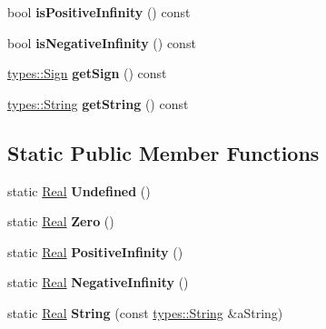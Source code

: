 \begin{DoxyCompactItemize}
bool {\bfseries is\+Positive\+Infinity} () const
\item 
\mbox{\label{classlibrary_1_1core_1_1types_1_1_real_a5d7286e45a9f05cda79402c9d8efbc13}} 
bool {\bfseries is\+Negative\+Infinity} () const
\item 
\mbox{\label{classlibrary_1_1core_1_1types_1_1_real_a0e92ad5d5a946dcc64385e1bf47003c8}} 
\hyperlink{_sign_8hpp_a06d9eaa410d43a0fa3f383040618e87d}{types\+::\+Sign} {\bfseries get\+Sign} () const
\item 
\mbox{\label{classlibrary_1_1core_1_1types_1_1_real_ac075065c78713b32a2144756efaae7b0}} 
\hyperlink{classlibrary_1_1core_1_1types_1_1_string}{types\+::\+String} {\bfseries get\+String} () const
\end{DoxyCompactItemize}
\subsection*{Static Public Member Functions}
\begin{DoxyCompactItemize}
\item 
\mbox{\label{classlibrary_1_1core_1_1types_1_1_real_a67778e3d4c5a5b6ca6ddcd47964b9a79}} 
static \hyperlink{classlibrary_1_1core_1_1types_1_1_real}{Real} {\bfseries Undefined} ()
\item 
\mbox{\label{classlibrary_1_1core_1_1types_1_1_real_a35434e6329366cb571efbd9c4ead6501}} 
static \hyperlink{classlibrary_1_1core_1_1types_1_1_real}{Real} {\bfseries Zero} ()
\item 
\mbox{\label{classlibrary_1_1core_1_1types_1_1_real_a7f4aa42fec951281e976eebca95e695e}} 
static \hyperlink{classlibrary_1_1core_1_1types_1_1_real}{Real} {\bfseries Positive\+Infinity} ()
\item 
\mbox{\label{classlibrary_1_1core_1_1types_1_1_real_a04f125b4861a4f348b9754fc65fbbb43}} 
static \hyperlink{classlibrary_1_1core_1_1types_1_1_real}{Real} {\bfseries Negative\+Infinity} ()
\item 
\mbox{\label{classlibrary_1_1core_1_1types_1_1_real_ac0209eca829dcdc3b1be96f834763d8e}} 
static \hyperlink{classlibrary_1_1core_1_1types_1_1_real}{Real} {\bfseries String} (const \hyperlink{classlibrary_1_1core_1_1types_1_1_string}{types\+::\+String} \&a\+String)
\end{DoxyCompactItemize}
